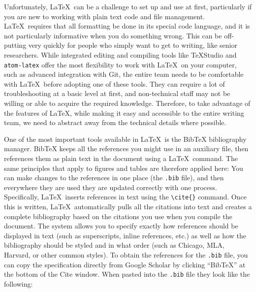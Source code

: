 Unfortunately, \LaTeX\ can be a challenge to set up and use at first,
particularly if you are new to working with plain text code and file management.
\LaTeX\ requires that all formatting be done in its special code language,
and it is not particularly informative when you do something wrong.
This can be off-putting very quickly for people
who simply want to get to writing, like senior researchers.
While integrated editing and compiling tools like TeXStudio
and \texttt{atom-latex}
offer the most flexibility to work with \LaTeX\ on your computer,
such as advanced integration with Git,
the entire team needs to be comfortable
with \LaTeX\ before adopting one of these tools.
They can require a lot of troubleshooting at a basic level at first,
and non-technical staff may not be willing or able to acquire the required knowledge.
Therefore, to take advantage of the features of \LaTeX,
while making it easy and accessible to the entire writing team,
we need to abstract away from the technical details where possible.

One of the most important tools available in \LaTeX\ is the BibTeX bibliography manager.
BibTeX keeps all the references you might use in an auxiliary file,
then references them as plain text in the document using a \LaTeX\ command.
The same principles that apply to figures and tables are therefore applied here:
You can make changes to the references in one place (the \texttt{.bib} file),
and then everywhere they are used they are updated correctly with one process.
Specifically, \LaTeX\ inserts references in text using the \texttt{\textbackslash cite\{\}} command.
Once this is written, \LaTeX\ automatically pulls all the citations into text
and creates a complete bibliography based on the citations you use when you compile the document.
The system allows you to specify exactly how references should be displayed in text
(such as superscripts, inline references, etc.)
as well as how the bibliography should be styled and in what order
(such as Chicago, MLA, Harvard, or other common styles).
To obtain the references for the \texttt{.bib} file,
you can copy the specification directly from Google Scholar
by clicking ``BibTeX'' at the bottom of the Cite window.
When pasted into the \texttt{.bib} file they look like the following:



